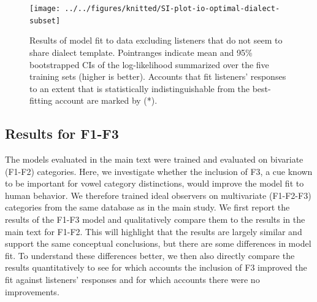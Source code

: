 \documentclass[preprint]{JASA}
\begin{document}
\begin{figure}

{\centering \texttt{[image: ../../figures/knitted/SI-plot-io-optimal-dialect-subset]} 

}

\caption{Results of model fit to data excluding listeners that do not seem to share dialect template. Pointranges indicate mean and 95\% bootstrapped CIs of the log-likelihood summarized over the five training sets (higher is better). Accounts that fit listeners' responses to an extent that is statistically indistinguishable from the best-fitting account are marked by (*).}\label{fig:SI-plot-io-optimal-dialect-subset}
\end{figure}

\subsection{Results for F1-F3}\label{sec:SI-F1F3}

The models evaluated in the main text were trained and evaluated on bivariate (F1-F2) categories. Here, we investigate whether the inclusion of F3, a cue known to be important for vowel category distinctions, would improve the model fit to human behavior. We therefore trained ideal observers on multivariate (F1-F2-F3) categories from the same database as in the main study. We first report the results of the F1-F3 model and qualitatively compare them to the results in the main text for F1-F2. This will highlight that the results are largely similar and support the same conceptual conclusions, but there are some differences in model fit. To understand these differences better, we then also directly compare the results quantitatively to see for which accounts the inclusion of F3 improved the fit against listeners' responses and for which accounts there were no improvements.
\end{document}
